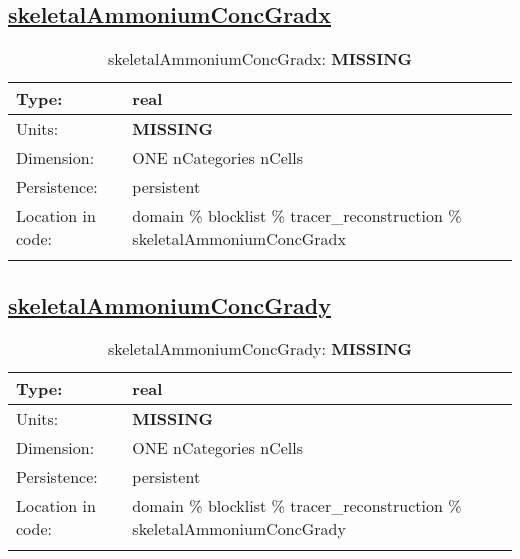 \subsection[skeletalAmmoniumConcGradx]{\hyperref[sec:var_tab_tracer_reconstruction]{skeletalAmmoniumConcGradx}}
\label{subsec:var_sec_tracer_reconstruction_skeletalAmmoniumConcGradx}
\begin{center}
\begin{longtable}{| p{2.0in} | p{4.0in} |}
        \hline 
        Type: & real \\
        \hline 
        Units: & {\bf \color{red} MISSING} \\
        \hline 
        Dimension: & ONE nCategories nCells \\
        \hline 
        Persistence: & persistent \\
        \hline 
         Location in code: & domain \% blocklist \% tracer\_reconstruction \% skeletalAmmoniumConcGradx \\
         \hline 
    \caption{skeletalAmmoniumConcGradx: {\bf \color{red} MISSING}}
\end{longtable}
\end{center}
\subsection[skeletalAmmoniumConcGrady]{\hyperref[sec:var_tab_tracer_reconstruction]{skeletalAmmoniumConcGrady}}
\label{subsec:var_sec_tracer_reconstruction_skeletalAmmoniumConcGrady}
\begin{center}
\begin{longtable}{| p{2.0in} | p{4.0in} |}
        \hline 
        Type: & real \\
        \hline 
        Units: & {\bf \color{red} MISSING} \\
        \hline 
        Dimension: & ONE nCategories nCells \\
        \hline 
        Persistence: & persistent \\
        \hline 
         Location in code: & domain \% blocklist \% tracer\_reconstruction \% skeletalAmmoniumConcGrady \\
         \hline 
    \caption{skeletalAmmoniumConcGrady: {\bf \color{red} MISSING}}
\end{longtable}
\end{center}
